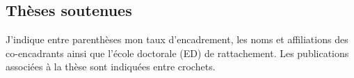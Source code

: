 \subsection{Thèses soutenues \label{app:phdencours}}

J'indique entre parenthèses mon taux d'encadrement, les noms et affiliations des co-encadrants ainsi que l'école doctorale (ED) de rattachement. Les publications associées à la thèse sont indiquées entre crochets.

\begin{description}

\end{description}
